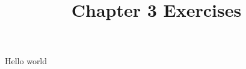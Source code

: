 \documentclass{article}
\title{Chapter 3 Exercises}
\begin{document}
  \maketitle
  \newpage
  \noindent
  \renewcommand{\chapternum}{3.A}
   Hello world
\end{document}
